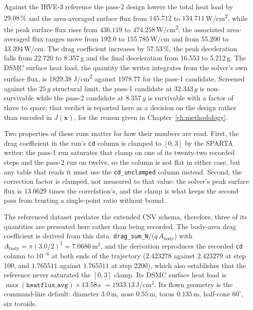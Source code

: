 Against the IRVE-3 reference the pass-2 design lowers the total heat load by $29.08\,\%$ and the
area-averaged surface flux from $145.712$ to $134.711$\,W/cm\textsuperscript{2}, while the peak
surface flux rises from $436.119$ to $474.258$\,W/cm\textsuperscript{2}; the associated
area-averaged flux ranges move from 192.0 to 155.785\,W/cm and from 55.200 to 43.394\,W/cm.
The drag coefficient increases by $57.53\,\%$, the peak deceleration falls from 22.720 to
8.357\,g and the final deceleration from 16.553 to 5.212\,g. The DSMC surface heat load, the
quantity the writer integrates from the solver's own surface flux, is 1829.38
J/cm\textsuperscript{2} against 1978.77 for the pass-1 candidate. Screened against the $25\,g$
structural limit, the pass-1 candidate at $32.343\,g$ is non-survivable while the pass-2
candidate at $8.357\,g$ is survivable with a factor of three to spare; that verdict is reported
here as a decision on the design rather than encoded in $J(\mathbf{x})$, for the reason given in
Chapter~\ref{ch:methodology}.

Two properties of these runs matter for how their numbers are read. First, the drag coefficient in the run's \texttt{cd} column is clamped to $[0,3]$ by the SPARTA writer: the pass-1 run saturates that clamp on one of its twenty-two recorded steps and the pass-2 run on twelve, so the column is not flat in either case, but any table that reads it must use the \texttt{cd\_unclamped} column instead. Second, the correction factor is clamped, not measured to that value: the solver's peak surface flux is $13.0629$ times the correlation's, and the clamp is what keeps the second pass from trusting a single-point ratio without bound.

The referenced dataset predates the extended CSV schema, therefore, three of its quantities are presented here rather than being recorded. The body-area drag coefficient is derived from this data.
\texttt{drag\_sum\_N}/($q\,A_{\mathrm{body}}$) with $A_{\mathrm{body}} = \pi(3.0/2)^2 =
7.0686$\,m$^2$, and the derivation reproduces the recorded \texttt{cd} column to $10^{-6}$ at both ends of the trajectory ($2.423278$ against $2.423279$ at step 100, and $1.765511$ against $1.765511$ at step 2200), which also establishes that the reference never saturated the $[0,3]$ clamp. Its DSMC surface heat load is $\max(\texttt{heatflux\_avg})\times 13.58$\,s $= 1933.13$\,J/cm$^2$. Its flown geometry is the command-line default: diameter $3.0$\,m, nose $0.55$\,m, torus $0.135$\,m, half-cone $60^\circ$, six toroids.


